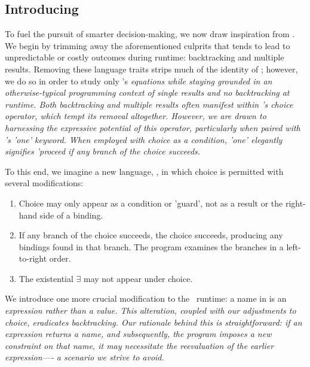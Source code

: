 \documentclass[article,screen,12pt, nonacm]{acmart}
\begin{document}
    

    
    


\subsection{Introducing \VMinus\ }
\label{vminus}

        To fuel the pursuit of smarter decision-making, we now draw inspiration
        from \VC. We begin by trimming away the aforementioned culprits that
        tends to lead to unpredictable or costly outcomes during runtime:
        backtracking and multiple results. Removing these language traits strips
        much of the identity of \VC; however, we do so in order to study only
        \VC's \it{equations} while staying grounded in an otherwise-typical
        programming context of single results and no backtracking at runtime.
        Both backtracking and multiple results often manifest within \VC's
        choice operator, which tempt its removal altogether. However, we are drawn
        to harnessing the expressive potential of this operator, particularly
        when paired with \VC's 'one' keyword. When employed with choice as a
        condition, 'one' elegantly signifies 'proceed if any branch of the
        choice succeeds. 
        
        To this end, we imagine a new language, \VMinus, in which choice is
        permitted with several modifications:

        \begin{enumerate}
        \item Choice may only appear as a condition or 'guard', not as a result
        or the right-hand side of a binding.
        \item If any branch of the choice succeeds, the choice succeeds,
        producing any bindings found in that branch. The program examines the
        branches in a left-to-right order.
        \item The existential $\exists$ may not appear under choice.
        \end{enumerate}

        We introduce one more crucial modification to the \VC\ runtime: a name in
        \VMinus is an \it{expression} rather than a \it{value}. This alteration,
        coupled with our adjustments to choice, eradicates backtracking. Our
        rationale behind this is straightforward: if an expression returns a
        name, and subsequently, the program imposes a new constraint on that
        name, it may necessitate the reevaluation of the earlier expression—- a
        scenario we strive to avoid. 
        
\end{document}
